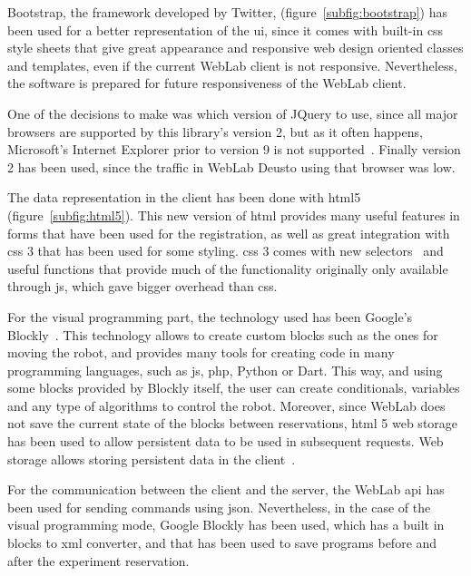 Bootstrap, the framework developed by Twitter, (figure~\ref{subfig:bootstrap}) has been used for a
better representation of the \acrlong{ui}, since it comes with built-in \acrshort{css} style
sheets that give great appearance and responsive web design oriented classes and templates, even if
the current WebLab client is not responsive. Nevertheless, the software is prepared for future
responsiveness of the WebLab client.

One of the decisions to make was which version of JQuery to use, since all major browsers are
supported by this library's version 2, but as it often happens, Microsoft's Internet Explorer prior
to version 9 is not supported~\cite{jquery_versions}. Finally version 2 has been used, since the
traffic in WebLab Deusto using that browser was low.

The data representation in the client has been done with \acrshort{html}5~\cite{html5_spec}
(figure~\ref{subfig:html5}). This new version of \acrshort{html} provides many useful features in
forms that have been used for the registration, as well as great integration with \acrshort{css} 3
that has been used for some styling. \acrshort{css} 3 comes with new selectors~\cite{css3_sel} and
useful functions that provide much of the functionality originally only available through
\acrlong{js}, which gave bigger overhead than \acrshort{css}.

For the visual programming part, the technology used has been Google's Blockly~\cite{blockly}. This
technology allows to create custom blocks such as the ones for moving the robot, and provides many
tools for creating code in many programming languages, such as \acrlong{js}, \acrshort{php}, Python
or Dart. This way, and using some blocks provided by Blockly itself, the user can create
conditionals, variables and any type of algorithms to control the robot. Moreover, since WebLab does
not save the current state of the blocks between reservations, \acrshort{html} 5 web storage has
been used to allow persistent data to be used in subsequent requests. Web storage allows storing
persistent data in the client~\cite{web_storage}.

For the communication between the client and the server, the WebLab \acrshort{api} has been used for
sending commands using \acrshort{json}. Nevertheless, in the case of the visual programming mode,
Google Blockly has been used, which has a built in blocks to \acrshort{xml} converter, and that has
been used to save programs before and after the experiment reservation.

